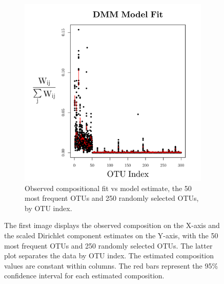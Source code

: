 \documentclass{template}
\begin{document}
\begin{figure}[ht!]
\begin{subfigure}[b]{0.36\textheight}
        \includegraphics[width=\textwidth]{Images/DMM250T.pdf}
        \caption{Observed compositional fit vs model estimate, the 50 most frequent OTUs and 250 randomly selected OTUs, by OTU index.}
    \end{subfigure}
    \caption{The first image displays the observed composition on the X-axis and the scaled Dirichlet component estimates on the Y-axis, with the 50 most frequent OTUs and 250 randomly selected OTUs. The latter plot separates the data by OTU index. The estimated composition values are constant within columns. The red bars represent the 95\% confidence interval for each estimated composition.}\label{fig:dmmFitBar250}
\end{figure}

\clearpage 
\end{document}
